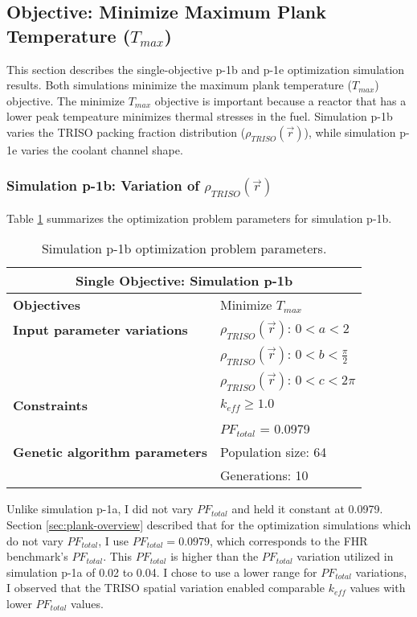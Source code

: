 \subsection{Objective: Minimize Maximum Plank Temperature ($T_{max}$)}
\label{sec:plank-1-obj-temp}
This section describes the single-objective p-1b and p-1e optimization simulation
results. 
Both simulations minimize the maximum plank temperature ($T_{max}$) objective. 
The minimize $T_{max}$ objective is important because a reactor that has a lower 
peak tempeature minimizes thermal stresses in the fuel. 
Simulation p-1b varies the \gls{TRISO} packing fraction distribution 
($\rho_{TRISO}(\vec{r})$), while simulation p-1e varies the coolant channel shape. 

\subsubsection{Simulation p-1b: Variation of $\rho_{TRISO}(\vec{r})$}
Table \ref{tab:simulationp1b} summarizes the optimization problem parameters for 
simulation p-1b.  
\begin{table}[htbp!]
    \centering
    \onehalfspacing
    \caption{Simulation p-1b optimization problem parameters.}
	\label{tab:simulationp1b}
    \footnotesize
    \begin{tabular}{l|p{4cm}}
    \hline 
    \multicolumn{2}{c}{\textbf{Single Objective: Simulation p-1b}} \\
    \hline 
    \textbf{Objectives} & Minimize $T_{max}$ \\
    \hline 
    \textbf{Input parameter variations}     
    & $\rho_{TRISO}(\vec{r})$: $0<a<2$ \\
    & $\rho_{TRISO}(\vec{r})$: $0<b<\frac{\pi}{2}$ \\
    & $\rho_{TRISO}(\vec{r})$: $0<c<2\pi$ \\
    \hline
    \textbf{Constraints} & $k_{eff} \geq 1.0$\\ 
    & $PF_{total}$ = 0.0979\\
    \hline 
    \textbf{Genetic algorithm parameters} & Population size: 64 \\
    & Generations: 10 \\
    \hline
    \end{tabular}
\end{table}
Unlike simulation p-1a, I did not vary $PF_{total}$ and held it constant at 0.0979. 
Section \ref{sec:plank-overview} described that for the optimization simulations which 
do not vary $PF_{total}$, I use $PF_{total} = 0.0979$, which corresponds to the 
\gls{FHR} benchmark's $PF_{total}$.  
This $PF_{total}$ is higher than the $PF_{total}$ variation utilized in simulation p-1a 
of 0.02 to 0.04. 
I chose to use a lower range for $PF_{total}$ variations, I observed that the TRISO 
spatial variation enabled comparable $k_{eff}$ values with lower $PF_{total}$ values. 

